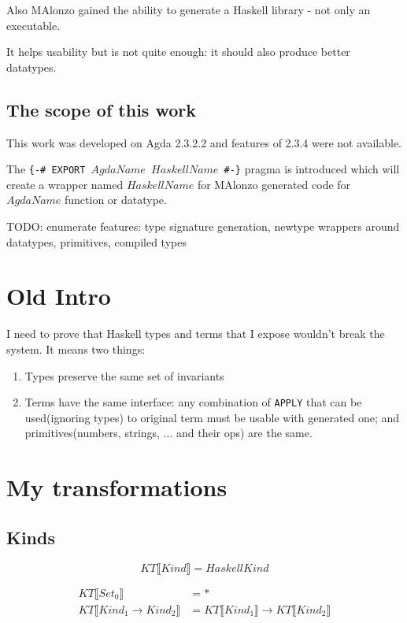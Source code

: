 Also MAlonzo gained the ability to generate a Haskell library - not only an executable.

It helps usability but is not quite enough: it should also produce better datatypes.

\subsection{The scope of this work}

This work was developed on Agda 2.3.2.2 and features of 2.3.4 were not available.

The \texttt{\{-\# EXPORT \(AgdaName\) \(HaskellName\) \#-\}} pragma is introduced which
will create a wrapper named \(HaskellName\) for MAlonzo generated code for \(AgdaName\) function or datatype.

TODO: enumerate features: type signature generation, newtype wrappers around datatypes, primitives, compiled types

\section{Old Intro}

I need to prove that Haskell types and terms that I expose wouldn't break the system.  It means two things:
\begin{enumerate}
\item Types preserve the same set of invariants
\item Terms have the same interface: any combination of \texttt{APPLY} that can be used(ignoring types) to original
      term must be usable with generated one; and primitives(numbers, strings, ... and their ops) are the same.
\end{enumerate}

\section{My transformations}

\subsection{Kinds}
\[ KT\llbracket Kind \rrbracket = HaskellKind \]

\begin{align*}
   KT\llbracket Set_0 \rrbracket &= *\\
   KT\llbracket Kind_1 \rightarrow Kind_2 \rrbracket &=
      KT\llbracket Kind_1 \rrbracket \rightarrow KT\llbracket Kind_2 \rrbracket
\end{align*}

